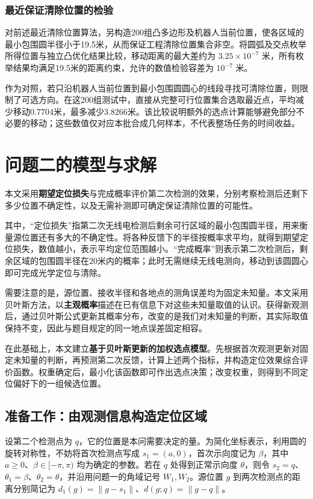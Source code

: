 \documentclass[UTF8,a4paper,zihao=-4,fontset=none]{ctexart}
\begin{document}
\subsubsection{最近保证清除位置的检验}

对前述最近清除位置算法，另构造200组凸多边形及机器人当前位置，使各区域的最小包围圆半径小于19.5米，从而保证工程清除位置集合非空。将圆弧及交点枚举所得位置与独立凸优化结果比较，移动距离的最大差约为 \(3.25\times10^{-7}\) 米，所有枚举结果均满足19.5米的距离约束，允许的数值检验容差为 \(10^{-7}\) 米。

作为对照，若只沿机器人当前位置到最小包围圆圆心的线段寻找可清除位置，则限制了可选方向。在这200组测试中，直接从完整可行位置集合选取最近点，平均减少移动0.7704米，最多减少3.8266米。该比较说明额外的选点计算能够避免部分不必要的移动；这些数值仅对应本批合成几何样本，不代表整场任务的时间收益。

\section{问题二的模型与求解}

本文采用\textbf{期望定位损失}与{完成概率}评价第二次检测的效果，分别考察检测后还剩下多少位置不确定性，以及无需补测即可确定保证清除位置的可能性。

其中，“定位损失”指第二次无线电检测后剩余可行区域的最小包围圆半径，用来衡量源位置还有多大的不确定性。将各种反馈下的半径按概率求平均，就得到期望定位损失，数值越小，表示平均定位范围越小。“完成概率”则表示第二次检测后，剩余区域的包围圆半径在20米内的概率；此时无需继续无线电测向，移动到该圆圆心即可完成光学定位与清除。

需要注意的是，源位置、接收半径和各地点的测角误差均为固定未知量。本文采用贝叶斯方法，以\textbf{主观概率}描述在已有信息下对这些未知量取值的认识。获得新观测后，通过贝叶斯公式更新其概率分布，改变的是我们对未知量的判断，其实际取值保持不变，因此与题目规定的同一地点误差固定相容。

在此基础上，本文建立\textbf{基于贝叶斯更新的加权选点模型}。先根据首次观测更新对固定未知量的判断，再预测第二次反馈，计算上述两个指标，并构造定位效果综合评价函数。权重确定后，最小化该函数即可作出选点决策；改变权重，则得到不同定位偏好下的一组候选位置。

\subsection{准备工作：由观测信息构造定位区域}

设第二个检测点为 \(q\)，它的位置是本问需要决定的量。为简化坐标表示，利用圆的旋转对称性，不妨将首次检测点写成 \(s_1=(a,0)\)，首次示向度记为 \(\beta\)，其中 \(a\ge0\)、\(\beta\in[-\pi,\pi)\) 均为确定的参数。若在 \(q\) 处得到正常示向度 \(\theta\)，则令 \(s_2=q\)、\(\theta_1=\beta\)、\(\theta_2=\theta\)，并沿用问题一的角域记号 \(W_1,W_2\)。源位置 \(g\) 到两次检测点的距离分别简记为 \(d_1(g)=\|g-s_1\|\)、\(d(g;q)=\|g-q\|\)。
\end{document}
